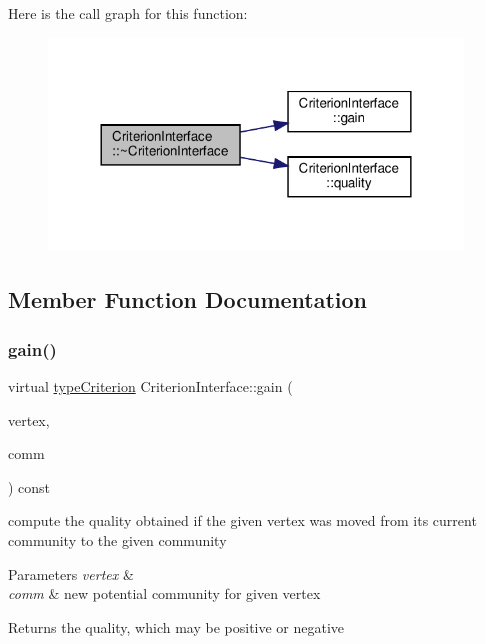 Here is the call graph for this function\+:
\nopagebreak
\begin{figure}[H]
\begin{center}
\leavevmode
\includegraphics[width=312pt]{classCriterionInterface_afe9cbd3c6f58b5c54828cbfdd6d9d48d_cgraph}
\end{center}
\end{figure}


\subsection{Member Function Documentation}
\mbox{\label{classCriterionInterface_aa0beec8287cd70e16c057e7995d0caca}} 
\subsubsection{\texorpdfstring{gain()}{gain()}}
{\footnotesize\ttfamily virtual \hyperlink{criterionInterface_8h_af71ff22f6355fd69a4a62104bfd59a83}{type\+Criterion} Criterion\+Interface\+::gain (\begin{DoxyParamCaption}\item[{const \hyperlink{edge_8h_a5fbd20c46956d479cb10afc9855223f6}{type\+Vertex} \&}]{vertex,  }\item[{const \hyperlink{graphUndirectedGroupable_8h_a914da95c9ea7f14f4b7f875c36818556}{type\+Community} \&}]{comm }\end{DoxyParamCaption}) const\hspace{0.3cm}{\ttfamily [pure virtual]}}

compute the quality obtained if the given vertex was moved from its current community to the given community


\begin{DoxyParams}{Parameters}
{\em vertex} & \\
\hline
{\em comm} & new potential community for given vertex \\
\hline
\end{DoxyParams}
\begin{DoxyReturn}{Returns}
the quality, which may be positive or negative 
\end{DoxyReturn}


